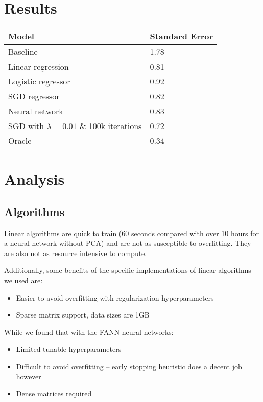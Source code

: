 \documentclass[journal]{IEEEtran}
\begin{document}
\section{Results}
\smallskip
\begin{center}
\begin{tabular}{|l | l|} %
\hline
Model               & Standard Error  \\ [0.5ex] %
\hline
Baseline            & 1.78 \\
\hline
Linear regression  & 0.81 \\
Logistic regressor  & 0.92 \\
SGD regressor       & 0.82 \\
Neural network      & 0.83 \\
SGD with $ \lambda = 0.01 $ \& 100k iterations & 0.72 \\
\hline
Oracle              & 0.34 \\
\hline %
\end{tabular}
\end{center}
\smallskip


\section{Analysis}

\subsection{Algorithms}
Linear algorithms are quick to train (60 seconds compared with over 10 hours
for a neural network without PCA) and are not as susceptible to overfitting.
They are also not as resource intensive to compute.

\par Additionally, some benefits of the specific implementations of linear algorithms we used are:
\begin{itemize}
    \item Easier to avoid overfitting with regularization hyperparameters
    \item Sparse matrix support, data sizes are 1GB
\end{itemize}

While we found that with the FANN neural networks:
\begin{itemize}
    \item Limited tunable hyperparameters
    \item Difficult to avoid overfitting -- early stopping heuristic does a decent job however
    \item Dense matrices required
\end{itemize}
\end{document}
